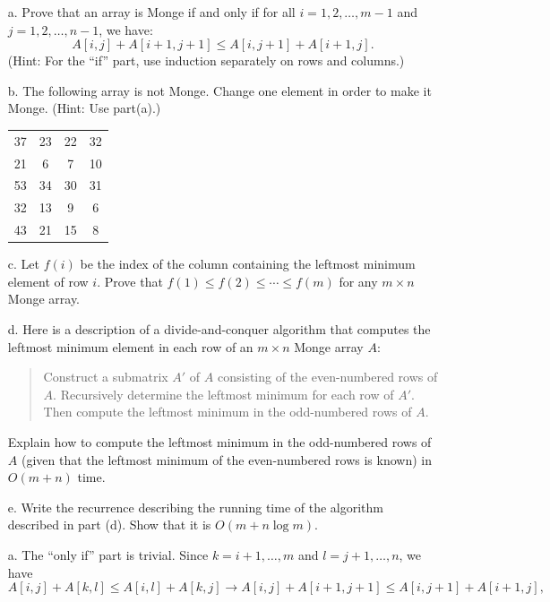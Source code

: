 \begin{enumerate}
{\begin{enumerate}
  \item[a.] Prove that an array is Monge if and only if for all $i = 1, 2,
    \dots, m - 1$ and $j = 1, 2, \dots, n - 1$, we have:
    \[
      A[i, j] + A[i + 1, j + 1] \le A[i, j + 1] + A[i + 1, j].
    \]
    (Hint: For the ``if'' part, use induction separately on rows and columns.)
  \item[b.] The following array is not Monge. Change one element in order to
    make it Monge. (Hint: Use part(a).)

    \begin{tabular}{cccc}
      37 & 23 & 22 & 32\\
      21 & 6  & 7  & 10\\
      53 & 34 & 30 & 31\\
      32 & 13 & 9  & 6\\
      43 & 21 & 15 & 8
    \end{tabular}
  \item[c.] Let $f(i)$ be the index of the column containing the leftmost
    minimum element of row $i$. Prove that $f(1) \le f(2) \le \cdots \le f(m)$
    for any $m \times n$ Monge array.
  \item[d.] Here is a description of a divide-and-conquer algorithm that
    computes the leftmost minimum element in each row of an $m \times n$ Monge array $A$:

    \begin{quote}
      Construct a submatrix $A'$ of $A$ consisting of the even-numbered rows of
      $A$.  Recursively determine the leftmost minimum for each row of $A'$.
      Then compute the leftmost minimum in the odd-numbered rows of $A$.
    \end{quote}

    Explain how to compute the leftmost minimum in the odd-numbered rows of $A$
    (given that the leftmost minimum of the even-numbered rows is known) in
    $O(m + n)$ time.

  \item[e.] Write the recurrence describing the running time of the algorithm
    described in part (d). Show that it is $O(m + n \log m)$.
\end{enumerate}
}

\begin{framed}
  \begin{enumerate}
    \item[a.] The ``only if'' part is trivial. Since $k = i + 1, \dots, m$ and $l = j + 1, \dots, n$, we have
      \[
        A[i, j] + A[k, l] \le A[i, l] + A[k, j] \rightarrow A[i, j] + A[i + 1, j + 1] \le A[i, j + 1] + A[i + 1, j],
      \]


\end{enumerate}
\end{framed}
\end{enumerate}
